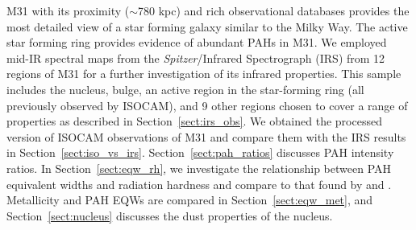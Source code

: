 M31 with its proximity ($\sim$780 kpc) and rich observational databases provides the most detailed view of a star forming galaxy similar 
to the Milky Way. The active star forming ring \citep{Barmby2006lr} provides evidence of abundant PAHs in M31. 
We employed mid-IR spectral maps from the {\em Spitzer}/Infrared Spectrograph (IRS) from 12 regions of M31 for a further investigation of 
its infrared properties. This sample includes the nucleus, bulge, an active region in the star-forming ring (all previously observed by ISOCAM), and 9 
other regions chosen to cover a range of properties as described in Section~\ref{sect:irs_obs}. 
We obtained the processed version of ISOCAM observations of M31 and compare them with the IRS results in Section~\ref{sect:iso_vs_irs}. 
Section~\ref{sect:pah_ratios} discusses PAH intensity ratios.
In Section~\ref{sect:eqw_rh}, we investigate the relationship between PAH equivalent widths and radiation 
hardness and compare to that found by \citet{Engelbracht_2008} and \citet{Gordon:2008lr}. Metallicity and PAH EQWs are compared in 
Section~\ref{sect:eqw_met}, and Section~\ref{sect:nucleus} discusses the dust properties of the nucleus. 	
